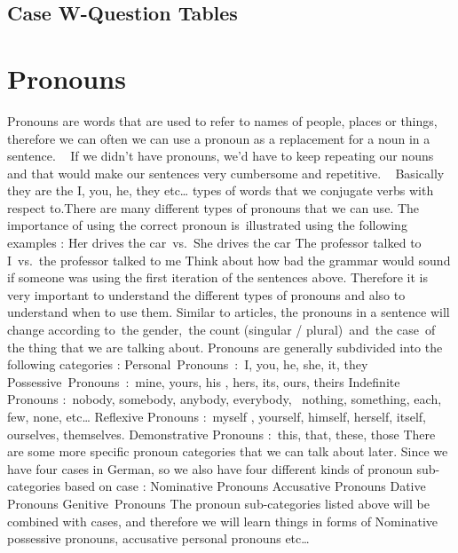 \documentclass[a4paper,12pt]{article}
\begin{document}
\subsection{\bf{Case W-Question Tables}}
\begin{adjustwidth}{2em}{0pt}
\label{sec:case_w_question_tables}



\end{adjustwidth}



\pagebreak

\section{Pronouns}
\label{sec:pronouns}

Pronouns are words that are used to refer to names of people, places or things,
therefore we can often we can use a pronoun as a replacement for a noun in a
sentence.
 
If we didn’t have pronouns, we’d have to keep repeating our nouns and that would
make our sentences very cumbersome and repetitive.
 
Basically they are the I, you, he, they etc… types of words that we conjugate
verbs with respect to.There are many different types of pronouns that we can
use. The importance of using the correct pronoun is illustrated using the
following examples :
Her drives the car vs. She drives the car
The professor talked to I vs. the professor talked to me
Think about how bad the grammar would sound if someone was using the first
iteration of the sentences above. Therefore it is very important to understand
the different types of pronouns and also to understand when to use them.
Similar to articles, the pronouns in a sentence will change according to the
gender, the count (singular / plural) and the case of the thing that we are
talking about.
Pronouns are generally subdivided into the following categories :
Personal Pronouns : I, you, he, she, it, they
Possessive Pronouns : mine, yours, his , hers, its, ours, theirs
Indefinite Pronouns : nobody, somebody, anybody, everybody,  nothing, something,
each, few, none, etc…
Reflexive Pronouns : myself , yourself, himself, herself, itself, ourselves,
themselves.
Demonstrative Pronouns : this, that, these, those
There are some more specific pronoun categories that we can talk about later.
Since we have four cases in German, so we also have four different kinds of
pronoun sub-categories based on case :
Nominative Pronouns
Accusative Pronouns
Dative Pronouns
Genitive Pronouns
The pronoun sub-categories listed above will be combined with cases, and
therefore we will learn things in forms of Nominative possessive pronouns,
accusative personal pronouns etc…
\end{document}
